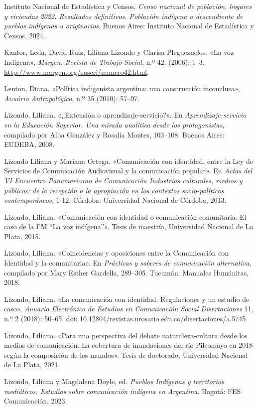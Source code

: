 \documentclass{tufte-handout}
\begin{document}
\begin{hangparas}{.25in}{1}
Instituto Nacional de Estadística y Censos. \emph{Censo nacional de
población, hogares y viviendas 2022. Resultados definitivos. Población
indígena o descendiente de pueblos indígenas u originarios}. Buenos
Aires: Instituto Nacional de Estadística y Censos, 2024.

Kantor, Leda, David Ruiz, Liliana Lizondo y Clarisa Pleguezuelos. «La
voz Indígena», \emph{Margen. Revista de Trabajo Social}, n.º 42. (2006):
1--3. \url{http://www.margen.org/suscri/numero42.html}.

Lenton, Diana. «Política indigenista argentina: una construcción
inconclusa», \emph{Anuário Antropológico}, n.º 35 (2010): 57--97.

Lizondo, Liliana. «¿Extensión o aprendizaje-servicio?». En
\emph{Aprendizaje-servicio en la Educación Superior. Una mirada
analítica desde los protagonistas}, compilado por Alba González y
Rosalía Montes, 103--108. Buenos Aires: EUDEBA, 2008.

Lizondo Liliana y Mariana Ortega. «Comunicación con identidad, entre la
Ley de Servicios de Comunicación Audiovisual y la comunicación popular».
En \emph{Actas del VI Encuentro Panamericano de Comunicación Industrias
culturales, medios y públicos: de la recepción a la apropiación en los
contextos socio-políticos contemporáneos,} 1-12. Córdoba: Universidad
Nacional de Córdoba, 2013.

Lizondo, Liliana. «Comunicación con identidad o comunicación
comunitaria. El caso de la FM ``La voz indígena''». Tesis de maestría,
Universidad Nacional de La Plata, 2015.

Lizondo, Liliana. «Coincidencias y oposiciones entre la Comunicación con
Identidad y la comunitaria». En \emph{Prácticas y saberes de
comunicación alternativa,} compilado por Mary Esther Gardella, 289--305.
Tucumán: Manuales Humánitas, 2018.

Lizondo, Liliana. «La comunicación con identidad. Regulaciones y un
estudio de caso», \emph{Anuario Electrónico de Estudios en Comunicación
Social Disertaciones} 11, n.º 2 (2018): 50--65. doi:
10.12804/revistas.urosario.edu.co/disertaciones/a.5745.

Lizondo, Liliana. «Para una perspectiva del debate naturaleza-cultura
desde los medios de comunicación. La cobertura de inundaciones del río
Pilcomayo en 2018 según la composición de los mundos». Tesis de
doctorado, Universidad Nacional de La Plata, 2021.

Lizondo, Liliana y Magdalena Doyle, ed. \emph{Pueblos Indígenas y
territorios mediáticos. Estudios sobre comunicación indígena en
Argentina}. Bogotá: FES Comunicación, 2023.


\end{hangparas}
\end{document}
